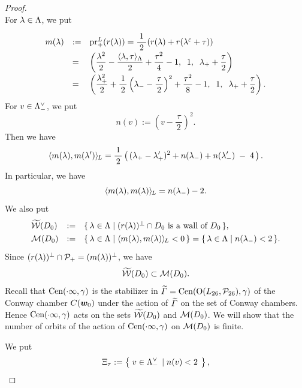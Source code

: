 \documentclass{amsart} %
\begin{document}
\begin{proof}
\[\]
For $\lambda\in \Lambda$, we put
%
%
\begin{equation}\label{eq:defmlambda}
\renewcommand{\arraystretch}{2}
\begin{array}{lll}
m(\lambda) &:=& \prLplus(\LeechRoot{\lambda})=\dfrac{\;1\;}{2}(\LeechRoot{\lambda}+
\LeechRoot{\lambda^\vep+\tau})\\
&=&
\left(\dfrac{\lambda^2}{2}-\dfrac{\intfLeech{\lambda, \tau}}{2}+\dfrac{\tau^2}{4}-1, 
\;\; 1,\;\; \lambdaplus +\dfrac{\tau}{2}\right)\\
&=&
\left(
\dfrac{\lambdaplus^2}{2}+\dfrac{1}{\,2\,}\left(\lambdaminus-\dfrac{\tau}{\,2\,}\right)^2+\dfrac{\tau^2}{8}-1, 
\;\; 1,\;\; \lambdaplus +\dfrac{\tau}{2}\right).
\end{array}
\end{equation}
%
For $v\in \Lambda_{-}^{\vee}$,
we put
\[
n(v):=\left(v-\dfrac{\,\tau\,}{2}\right)^2.
\]
Then we have
%
\begin{equation}\label{eq:mlmlsprime}
 \langle m(\lambda), m(\lambda^{\prime}) \rangle_{\hskip -1pt L} =\frac{1}{\,2\,}
 \left(\,
({\lambda}_{+} - {\lambda}_{+}^{\prime} )^2
+
n({\lambda}_{-})
+
n({\lambda}_{-}^{\prime})
\;-\;4 
\,\right).
\end{equation}
%
In particular, we have 
%
\[
\langle m(\lambda), m(\lambda) \rangle_{\hskip -1pt L}=n({\lambda}_{-})-2.
\]
%
We also put 
\[
\renewcommand{\arraystretch}{1.3}
\begin{array}{lll}
\tilwalls(D_0) &:= & \set{\lambda\in \Leech}{\textrm{$(\LeechRoot{\lambda})\sperp \cap D_0$ is a wall of $D_0$}}, \\
\MMM(D_0) &:=& \set{\lambda\in \Leech}{\intfL{m(\lambda), m(\lambda)}<0}=\set{\lambda\in \Leech}{n(\lambdaminus)<2}.
\end{array}
\]
Since $(r(\lambda))^{\perp}\cap \mathord{\mathcal{P}}_{+}=(m(\lambda) )^{\perp}$,
we have 
%
\begin{equation}\label{eq:tilWWWMMM}
\widetilde{\mathord{\mathcal{W}}}(D_0)\subset \mathord{\mathcal{M}}(D_0).
\end{equation}
%
Recall that $\mathrm{Cen}(\cdot \infty, \gamma)$ is 
the stabilizer in $\widetilde{\varGamma}=\mathrm{Cen}(\mathord{\mathrm{O}}(L_{26}, \mathord{\mathcal{P}}_{26}), \gamma)$ of the Conway chamber $\mathord{C}(\boldsymbol{w}_0)$
under the action of $\widetilde{\varGamma}$ on the set of Conway chambers.
Hence $\mathrm{Cen}(\cdot \infty, \gamma)$
acts on the sets $\widetilde{\mathord{\mathcal{W}}}(D_0)$ and $\mathord{\mathcal{M}}(D_0) $.
We will show that the number of orbits of the action of $\mathrm{Cen}(\cdot \infty, \gamma)$ on $ \mathord{\mathcal{M}}(D_0)$
is finite.
\par
We put
%
\begin{equation}\label{eq:Xi}
\Xitau:=\bigset{v\in \Leechminus\dual }{n(v)<2},

\end{equation}
\end{proof}
\end{document}

